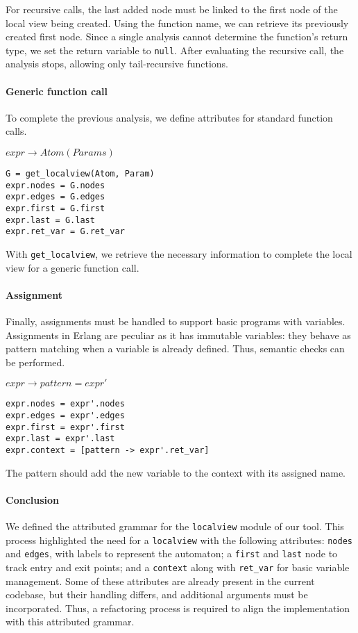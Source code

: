 For recursive calls, the last added node must be linked to the first  
node of the local view being created. Using the function name,  
we can retrieve its previously created first node.  
Since a single analysis cannot determine the function's return type,  
we set the return variable to \texttt{null}. After evaluating the  
recursive call, the analysis stops, allowing only tail-recursive  
functions.  

\paragraph{Generic function call}  
To complete the previous analysis, we define attributes for  
standard function calls.  

\bigskip

\noindent $expr \to Atom(Params)$

\begin{verbatim}
G = get_localview(Atom, Param)
expr.nodes = G.nodes
expr.edges = G.edges
expr.first = G.first
expr.last = G.last
expr.ret_var = G.ret_var 
\end{verbatim}

With \texttt{get\_localview}, we retrieve the necessary information  
to complete the local view for a generic function call.  

\paragraph{Assignment}  
Finally, assignments must be handled to support basic programs  
with variables. Assignments in Erlang are peculiar as it has
immutable variables: they behave  
as pattern matching when a variable is already defined.
Thus, semantic checks can be performed.  

\bigskip

\noindent $expr \to pattern = expr'$

\begin{verbatim}
expr.nodes = expr'.nodes
expr.edges = expr'.edges
expr.first = expr'.first
expr.last = expr'.last
expr.context = [pattern -> expr'.ret_var]
\end{verbatim}

The pattern should add the new variable to the context  
with its assigned name.  

\paragraph{Conclusion}
We defined the attributed grammar for the \texttt{localview} module of our tool.  
This process highlighted the need for a \texttt{localview} with the following  
attributes: \texttt{nodes} and \texttt{edges}, with labels to represent the  
automaton; a \texttt{first} and \texttt{last} node to track entry and exit  
points; and a \texttt{context} along with \texttt{ret\_var} for basic  
variable management.
Some of these attributes are already present in the current codebase,  
but their handling differs, and additional arguments must be incorporated.  
Thus, a refactoring process is required to align the implementation with  
this attributed grammar.


